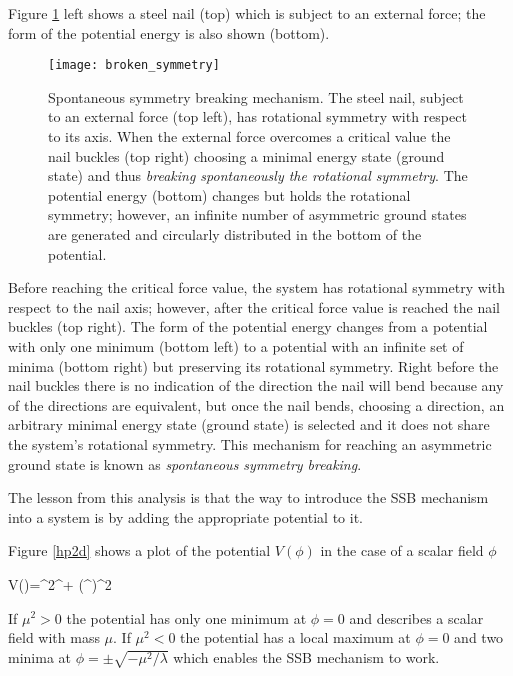 Figure \ref{ssb} left shows a steel nail (top) which is subject to an external force; the form of the potential energy is also shown (bottom).

\begin{figure}[!h]
\centering
\texttt{[image: broken\_symmetry]}
\caption[Spontaneous symmetry breaking mechanism]{Spontaneous symmetry breaking mechanism. The steel nail, subject to an external force (top left), has rotational symmetry with respect to its axis. When the external force overcomes a critical value the nail buckles (top right) choosing a minimal energy state (ground state) and thus \textit{breaking spontaneously the rotational symmetry}. The potential energy (bottom) changes but holds the rotational symmetry; however, an infinite number of asymmetric ground states are generated and circularly distributed in the bottom of the potential\cite{broken_symmetry}.}
\label{ssb}
\end{figure}

Before reaching the critical force value, the system has rotational symmetry with respect to the nail axis; however, after the critical force value is reached the nail buckles (top right). The form of the potential energy changes from a potential with only one minimum (bottom left) to a potential with an infinite set of minima (bottom right) but preserving its rotational symmetry. Right before the nail buckles there is no indication of the direction the nail will bend because any of the directions are equivalent, but once the nail bends, choosing a direction, an arbitrary minimal energy state (ground state) is selected and it does not share the system's rotational symmetry. This mechanism for reaching an asymmetric ground state is known as \textit{spontaneous symmetry breaking}.       

The lesson from this analysis is that the way to introduce the SSB mechanism into a system is by adding the appropriate potential to it.

Figure \ref{hp2d} shows a plot of the potential $V(\phi)$ in the case of a scalar field $\phi$

\beqn\label{Higgs_potential}
V(\phi)=\mu^2\phi^\dagger\phi + \lambda(\phi^\dagger\phi)^2
\eeqn

If $\mu^2>0$ the potential has only one minimum at $\phi=0$ and describes a scalar field with mass $\mu$. If $\mu^2<0$ the potential has a local maximum at $\phi=0$ and two minima at $\phi=\pm \sqrt{-\mu^2/\lambda}$ which enables the SSB mechanism to work.


